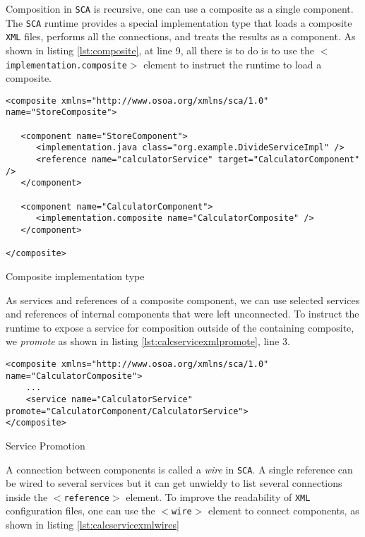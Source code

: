 Composition in \texttt{SCA} is recursive, one can use a composite as a single component. The \texttt{SCA} runtime provides a special implementation
type that loads a composite \texttt{XML} files, performs all the connections, and treats the results as a component. As shown in listing
\ref{lst:composite}, at line 9, all there is to do is to use the \texttt{$<$implementation.composite$>$} element to instruct the runtime
to load a composite.

\begin{listing}
\begin{verbatim}
<composite xmlns="http://www.osoa.org/xmlns/sca/1.0" name="StoreComposite">

   <component name="StoreComponent">
      <implementation.java class="org.example.DivideServiceImpl" />
      <reference name="calculatorService" target="CalculatorComponent" />
   </component>

   <component name="CalculatorComponent">
      <implementation.composite name="CalculatorComposite" />
   </component>

</composite>
\end{verbatim}
\caption{Composite implementation type}
\label{lst:composite}
\end{listing}

As services and references of a composite component, we can use selected services and references of internal components
that were left unconnected. To instruct the runtime to expose a service for composition outside of the containing composite,
we \emph{promote} as shown in listing \ref{lst:calcservicexmlpromote}, line 3.

\begin{listing}
\begin{verbatim}
<composite xmlns="http://www.osoa.org/xmlns/sca/1.0" name="CalculatorComposite">
    ...
    <service name="CalculatorService" promote="CalculatorComponent/CalculatorService">
</composite>
\end{verbatim}
\caption{Service Promotion}
\label{lst:calcservicexmlpromote}
\end{listing}

A connection between components is called a \emph{wire} in \texttt{SCA}. A single reference can be wired to several services
but it can get unwieldy to list several connections inside the \texttt{$<$reference$>$} element. To improve the readability
of \texttt{XML} configuration files, one can use the \texttt{$<$wire$>$} element to connect components, as shown in listing 
\ref{lst:calcservicexmlwires}

